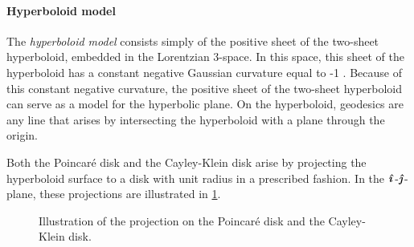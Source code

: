 \paragraph{Hyperboloid model} The \emph{hyperboloid model} consists simply of the positive sheet of the two-sheet hyperboloid, embedded in the Lorentzian 3-space. In this space, this sheet of the hyperboloid has a constant negative Gaussian curvature equal to -1 \cite{Balazs1986}. Because of this constant negative curvature, the positive sheet of the two-sheet hyperboloid can serve as a model for the hyperbolic plane. On the hyperboloid, geodesics are any line that arises by intersecting the hyperboloid with a plane through the origin.

Both the Poincaré disk and the Cayley-Klein disk arise by projecting the hyperboloid surface to a disk with unit radius in a prescribed fashion. In the \(\quati\)-\(\quatj\)-plane, these projections are illustrated in \cref{fig:hyperboloid_projection}.

\begin{figure}[ht!]
    \centering
    
    \caption{Illustration of the projection on the Poincaré disk and the Cayley-Klein disk.}
    \label{fig:hyperboloid_projection}
\end{figure}

